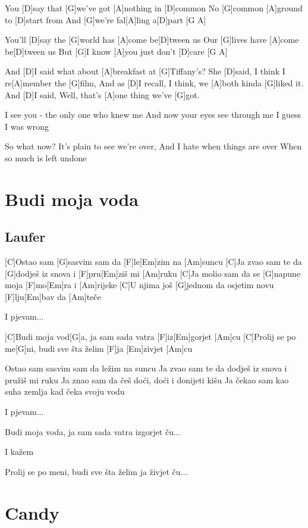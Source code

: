 \documentclass[a4paper,12pt]{article}
\begin{document}
\begin{multicols}{2}
\begin{guitar}
You [D]say that [G]we've got [A]nothing in [D]common 
No [G]common [A]ground to [D]start from 
And [G]we're fal[A]ling a[D]part [G A]


You'll [D]say the [G]world has [A]come be[D]tween us 
Our [G]lives have [A]come be[D]tween us 
But [G]I know [A]you just don't [D]care [G A]


And [D]I said what about [A]breakfast at [G]Tiffany's? 
She [D]said, I think I re[A]member the [G]film,                 
And as [D]I recall, I think, 
we [A]both kinda [G]liked it.  
And [D]I said, Well, that's [A]one thing we've [G]got. 

 
I see you - the only one who knew me 
And now your eyes see through me 
I guess I was wrong 


So what now?  It's plain to see we're over, 
And I hate when things are over 
When so much is left undone 

\end{guitar}
\section{Budi moja voda}
\subsection*{Laufer}
\begin{guitar}
[C G F Em Am]


[C]Ostao sam [G]sasvim sam da [F]le[Em]zim na [Am]suncu
[C]Ja zvao sam te da [G]dodješ iz snova 
i [F]pru[Em]ziš mi [Am]ruku
[C]Ja molio sam da se [G]napune moja [F]mo[Em]ra i [Am]rijeke
[C]U njima još [G]jednom da osjetim 
novu [F]lju[Em]bav da [Am]teče


I pjevam...

[C]Budi moja vod[G]a, ja sam sada vatra
[F]iz[Em]gorjet [Am]cu
[C]Prolij se po me[G]ni, budi sve šta želim
[F]ja [Em]zivjet [Am]cu


Ostao sam sasvim sam da ležim na suncu
Ja zvao sam te da dodješ iz snova
i pružiš mi ruku
Ja znao sam da češ doći, doći i donijeti kišu
Ja čekao sam kao suha zemlja 
kad čeka svoju vodu


I pjevam...

Budi moja voda, ja sam sada vatra
izgorjet ču...


I kažem

Prolij se po meni, budi sve šta želim
ja živjet ču...

\end{guitar}
\section{Candy}

\end{multicols}
\end{document}
